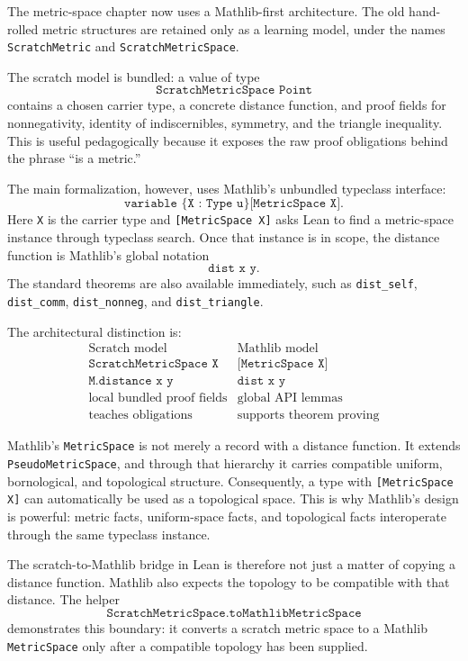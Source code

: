 \begin{remark*}
The metric-space chapter now uses a Mathlib-first architecture. The old
hand-rolled metric structures are retained only as a learning model, under the
names \texttt{ScratchMetric} and \texttt{ScratchMetricSpace}.

The scratch model is bundled: a value of type
\[
  \texttt{ScratchMetricSpace Point}
\]
contains a chosen carrier type, a concrete distance function, and proof fields
for nonnegativity, identity of indiscernibles, symmetry, and the triangle
inequality. This is useful pedagogically because it exposes the raw proof
obligations behind the phrase ``is a metric.''

The main formalization, however, uses Mathlib's unbundled typeclass interface:
\[
  \texttt{variable \{X : Type u\} [MetricSpace X]}.
\]
Here \texttt{X} is the carrier type and \texttt{[MetricSpace X]} asks Lean to
find a metric-space instance through typeclass search. Once that instance is in
scope, the distance function is Mathlib's global notation
\[
  \texttt{dist x y}.
\]
The standard theorems are also available immediately, such as
\texttt{dist\_self}, \texttt{dist\_comm}, \texttt{dist\_nonneg}, and
\texttt{dist\_triangle}.
\end{remark*}

\begin{remark*}
The architectural distinction is:
\[
\begin{array}{c|c}
\text{Scratch model} & \text{Mathlib model}\\
\hline
\texttt{ScratchMetricSpace X} & \texttt{[MetricSpace X]}\\
\texttt{M.distance x y} & \texttt{dist x y}\\
\text{local bundled proof fields} & \text{global API lemmas}\\
\text{teaches obligations} & \text{supports theorem proving}
\end{array}
\]

Mathlib's \texttt{MetricSpace} is not merely a record with a distance function.
It extends \texttt{PseudoMetricSpace}, and through that hierarchy it carries
compatible uniform, bornological, and topological structure. Consequently, a
type with \texttt{[MetricSpace X]} can automatically be used as a topological
space. This is why Mathlib's design is powerful: metric facts, uniform-space
facts, and topological facts interoperate through the same typeclass instance.

The scratch-to-Mathlib bridge in Lean is therefore not just a matter of copying
a distance function. Mathlib also expects the topology to be compatible with
that distance. The helper
\[
  \texttt{ScratchMetricSpace.toMathlibMetricSpace}
\]
demonstrates this boundary: it converts a scratch metric space to a Mathlib
\texttt{MetricSpace} only after a compatible topology has been supplied.
\end{remark*}

